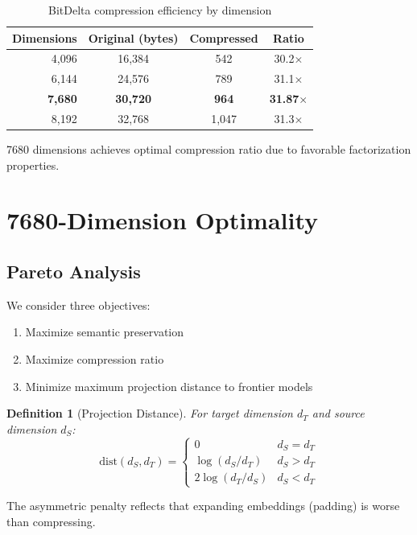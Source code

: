 \documentclass[11pt,letterpaper]{article}
\newtheorem{definition}{Definition}[section]
\begin{document}
\begin{table}[h]
\centering
\caption{BitDelta compression efficiency by dimension}
\label{tab:compression}
\begin{tabular}{rccc}
\toprule
\textbf{Dimensions} & \textbf{Original (bytes)} & \textbf{Compressed} & \textbf{Ratio} \\
\midrule
4,096 & 16,384 & 542 & 30.2$\times$ \\
6,144 & 24,576 & 789 & 31.1$\times$ \\
\textbf{7,680} & \textbf{30,720} & \textbf{964} & \textbf{31.87$\times$} \\
8,192 & 32,768 & 1,047 & 31.3$\times$ \\
\bottomrule
\end{tabular}
\end{table}

7680 dimensions achieves optimal compression ratio due to favorable factorization properties.

\section{7680-Dimension Optimality}
\label{sec:optimality}

\subsection{Pareto Analysis}

We consider three objectives:
\begin{enumerate}
    \item Maximize semantic preservation
    \item Maximize compression ratio
    \item Minimize maximum projection distance to frontier models
\end{enumerate}

\begin{definition}[Projection Distance]
For target dimension $d_T$ and source dimension $d_S$:
\begin{equation}
\text{dist}(d_S, d_T) = \begin{cases}
0 & d_S = d_T \\
\log(d_S / d_T) & d_S > d_T \\
2\log(d_T / d_S) & d_S < d_T
\end{cases}
\end{equation}
\end{definition}

The asymmetric penalty reflects that expanding embeddings (padding) is worse than compressing.
\end{document}
